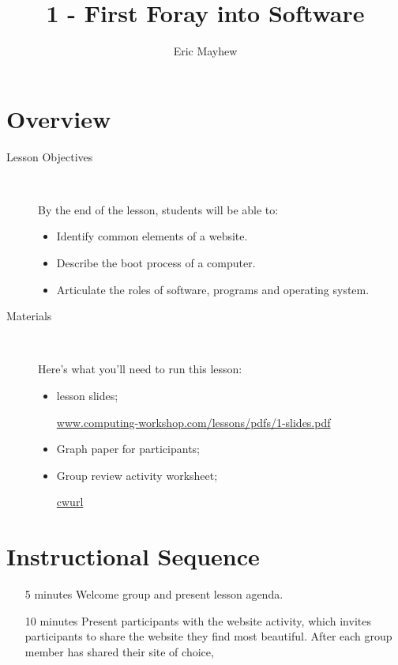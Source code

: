 \documentclass[12pt]{article}
\title{1 - First Foray into Software}
\author{Eric Mayhew}
\date{}
\begin{document}
\renewcommand{\abstractname}{\vspace{-\baselineskip}}
\maketitle
\begin{abstract}

\end{abstract}
\section*{Overview}
\begin{description}
  \item [Lesson Objectives] 
    ~

   By the end of the lesson, students will be able to:
  \begin{itemize}

    \item Identify common elements of a website.

    \item Describe the boot process of a computer.

    \item Articulate the roles of software, programs and operating
      system.

  \end{itemize}
  \item [Materials]~

Here's what you'll need to run this lesson:
  \begin{itemize}
    \item
      lesson slides;

      \url{www.computing-workshop.com/lessons/pdfs/1-slides.pdf}

    \item
      Graph paper for participants;

    \item
      Group review activity worksheet;

      \url{cwurl}
  \end{itemize}
\end{description}
  \section*{Instructional Sequence}
  \begin{itemize}
    \item[5 minutes] Welcome group and present lesson agenda.
    \item[10 minutes] Present participants with the website activity, which
      invites participants to share the website they find most beautiful. After
      each group member has shared their site of choice, 
  \end{itemize}
\end{document}
